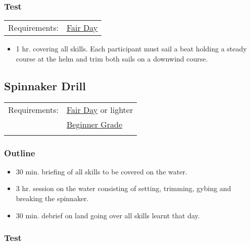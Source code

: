 \documentclass[12pt]{scrartcl}
\begin{document}
\subsubsection{Test} \label{subsubsec:intermediate sailing:test}

\label{tab:intermediate sailing:test:requirements}
\begin{tabular}{ll}
	Requirements: & \hyperlink{condition:fair day}{Fair Day} \\
\end{tabular}

\begin{itemize}
	\item 1 hr. covering all skills. Each participant must sail a beat holding a steady course at the helm and trim both sails on a downwind course.
\end{itemize}

\subsection{Spinnaker Drill} \label{subsec:spinnaker drill}

\label{tab:spinnaker drill:requirements}
\begin{tabular}{ll}
	Requirements: & \hyperlink{condition:fair day}{Fair Day} or lighter \\
	& \hyperlink{grade:beginner}{Beginner Grade} \\
	& \nameref{subsec:intermediate sailing} \\
\end{tabular}

\subsubsection{Outline} \label{subsubsec:spinnaker drill:outline}

\begin{itemize}
	\item 30 min. briefing of all skills to be covered on the water.
	\item 3 hr. session on the water consisting of setting, trimming, gybing and breaking the spinnaker.
	\item 30 min. debrief on land going over all skills learnt that day.
\end{itemize}

\subsubsection{Test} \label{subsubsec:spinnaker drill:test}
\end{document}
